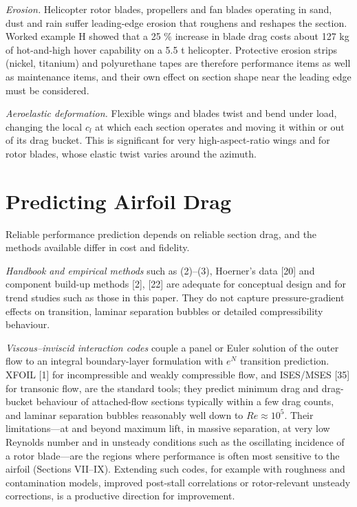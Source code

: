 \documentclass[10pt,a4paper,twocolumn]{article}
\begin{document}
\emph{Erosion.} Helicopter rotor blades, propellers and fan blades
operating in sand, dust and rain suffer leading-edge erosion that
roughens and reshapes the section. Worked example H showed that a 25 \%
increase in blade drag costs about 127 kg of hot-and-high hover
capability on a 5.5 t helicopter. Protective erosion strips (nickel,
titanium) and polyurethane tapes are therefore performance items as well
as maintenance items, and their own effect on section shape near the
leading edge must be considered.

\emph{Aeroelastic deformation.} Flexible wings and blades twist and bend
under load, changing the local \(c_l\) at which each section operates
and moving it within or out of its drag bucket. This is significant for
very high-aspect-ratio wings and for rotor blades, whose elastic twist
varies around the azimuth.

\hypertarget{predicting-airfoil-drag}{%
\section{Predicting Airfoil Drag}\label{predicting-airfoil-drag}}

Reliable performance prediction depends on reliable section drag, and
the methods available differ in cost and fidelity.

\emph{Handbook and empirical methods} such as (2)--(3), Hoerner's data
{[}20{]} and component build-up methods {[}2{]}, {[}22{]} are adequate
for conceptual design and for trend studies such as those in this paper.
They do not capture pressure-gradient effects on transition, laminar
separation bubbles or detailed compressibility behaviour.

\emph{Viscous--inviscid interaction codes} couple a panel or Euler
solution of the outer flow to an integral boundary-layer formulation
with \(e^N\) transition prediction. XFOIL {[}1{]} for incompressible and
weakly compressible flow, and ISES/MSES {[}35{]} for transonic flow, are
the standard tools; they predict minimum drag and drag-bucket behaviour
of attached-flow sections typically within a few drag counts, and
laminar separation bubbles reasonably well down to \(Re\approx10^5\).
Their limitations---at and beyond maximum lift, in massive separation,
at very low Reynolds number and in unsteady conditions such as the
oscillating incidence of a rotor blade---are the regions where
performance is often most sensitive to the airfoil (Sections VII--IX).
Extending such codes, for example with roughness and contamination
models, improved post-stall correlations or rotor-relevant unsteady
corrections, is a productive direction for improvement.
\end{document}
